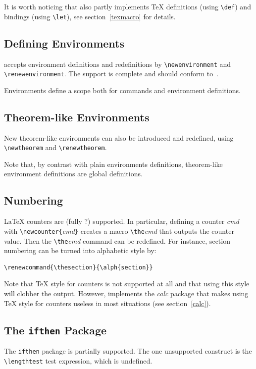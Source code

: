 It is worth noticing that \hevea{} also partly implements \TeX{} definitions
(using \verb+\def+) and bindings (using \verb+\let+), see
section~\ref{texmacro} for details.


\subsection{Defining Environments}
\hevea{} accepts environment definitions and redefinitions
by \verb+\newenvironment+ and \verb+\renewenvironment+.
The support is complete and should conform
to~\cite[Sections~C.8.2]{latex}.


Environments define a scope both for commands and environment
definitions.


\subsection{Theorem-like Environments}
New theorem-like environments can also be introduced and redefined,
using \verb+\newtheorem+ and \verb+\renewtheorem+.

Note that, by contrast with plain environments definitions,
theorem-like environment definitions are global definitions.

\subsection{Numbering}
\LaTeX{} counters are (fully ?) supported.
In particular, defining a counter \textit{cmd} with
\verb+\newcounter{+\textit{cmd}\verb+}+ creates a macro
\verb+\the+\textit{cmd} that outputs the counter value.
Then the \verb+\the+\textit{cmd} command can be redefined.
For instance, section numbering can be turned into alphabetic style by:
\begin{verbatim}
\renewcommand{\thesection}{\alph{section}}
\end{verbatim}

Note that \TeX{} style for counters is not supported at all and that using
this style will clobber the output. However, \hevea{} implements
the \textit{calc} package that makes using \TeX{} style for counters
useless in most situations (see section~\ref{calc}).


\subsection{The \texttt{ifthen} Package}\label{ifthen}
The \texttt{ifthen} package is partially supported.
The one unsupported construct is the
\verb+\lengthtest+ test expression, which is
undefined.

